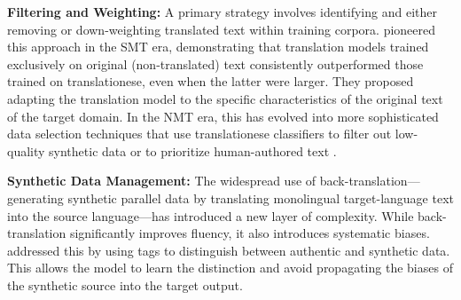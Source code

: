 \documentclass[11pt,a4paper]{article}
\begin{document}
\textbf{Filtering and Weighting:} A primary strategy involves identifying and either removing or down-weighting translated text within training corpora. \citet{lembersky2013improving} pioneered this approach in the SMT era, demonstrating that translation models trained exclusively on original (non-translated) text consistently outperformed those trained on translationese, even when the latter were larger. They proposed adapting the translation model to the specific characteristics of the original text of the target domain. In the NMT era, this has evolved into more sophisticated data selection techniques that use translationese classifiers to filter out low-quality synthetic data or to prioritize human-authored text \cite{pylypenko2021comparing}.

\textbf{Synthetic Data Management:} The widespread use of back-translation---generating synthetic parallel data by translating monolingual target-language text into the source language---has introduced a new layer of complexity. While back-translation significantly improves fluency, it also introduces systematic biases. \citet{riley2020translationese} addressed this by using tags to distinguish between authentic and synthetic data. This allows the model to learn the distinction and avoid propagating the biases of the synthetic source into the target output.
\end{document}
